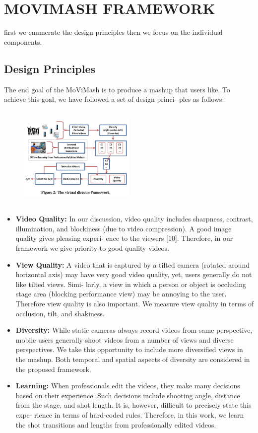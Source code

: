 \documentclass{sig-alternate}
\begin{document}
\section{MOVIMASH FRAMEWORK}
first we enumerate the design principles then we focus on the individual components.
\subsection{Design Principles}
The end goal of the MoViMash is to produce a mashup that users
like. To achieve this goal, we have followed a set of design princi-
ples as follows:

\begin{figure}[h]
\includegraphics[width=0.5\textwidth ,height = 5cm]{3}
\end{figure}

\begin{itemize}
    \item \textbf{Video Quality:} In our discussion, video quality includes
sharpness, contrast, illumination, and blockiness (due to video
compression). A good image quality gives pleasing experi-
ence to the viewers [10]. Therefore, in our framework we
give priority to good quality videos.
    \item \textbf{View Quality:} A video that is captured by a tilted camera
(rotated around horizontal axis) may have very good video
quality, yet, users generally do not like tilted views. Simi-
larly, a view in which a person or object is occluding stage
area (blocking performance view) may be annoying to the
user. Therefore view quality is also important. We measure
view quality in terms of occlusion, tilt, and shakiness.
    \item \textbf{Diversity:} While static cameras always record videos from
same perspective, mobile users generally shoot videos from
a number of views and diverse perspectives. We take this
opportunity to include more diversified views in the mashup.
Both temporal and spatial aspects of diversity are considered
in the proposed framework.
    \item \textbf{Learning:} When professionals edit the videos, they make
many decisions based on their experience. Such decisions
include shooting angle, distance from the stage, and shot
length. It is, however, difficult to precisely state this expe-
rience in terms of hard-coded rules. Therefore, in this work,
we learn the shot transitions and lengths from professionally
edited videos.
\end{itemize}
\end{document}
